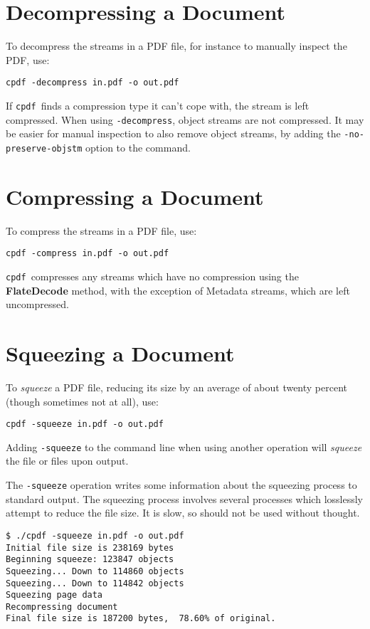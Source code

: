 \documentclass{book}
\newcommand{\cpdf}{\texttt{cpdf}}
\begin{document}
  \section{Decompressing a Document}
  To decompress the streams in a PDF file, for instance to manually inspect the
PDF, use:
  \begin{framed}
   \small\verb!cpdf -decompress in.pdf -o out.pdf!
  \end{framed}
  \noindent If \cpdf\ finds a compression type it can't cope with, the stream is left compressed. When using \texttt{-decompress}, object streams are not compressed. It may be easier for manual inspection to also remove object streams, by adding the \texttt{-no-preserve-objstm} option to the command.
  \section{Compressing a Document}
  To compress the streams in a PDF file, use:
  \begin{framed}
    \small\verb!cpdf -compress in.pdf -o out.pdf!
  \end{framed}
  \noindent\cpdf\ compresses any streams which have no compression using the
  \textbf{Flate\-Decode} method, with the exception of Metadata streams, which
  are left uncompressed.
  
  \section{Squeezing a Document}
  To \textit{squeeze} a PDF file, reducing its size by an average of about twenty percent (though sometimes not at all), use:
  \begin{framed}
    \small\verb!cpdf -squeeze in.pdf -o out.pdf!
  \end{framed}
  \noindent Adding \texttt{-squeeze} to the command line when using another operation will \textit{squeeze} the file or files upon output.
  
  The \texttt{-squeeze} operation writes some information about the squeezing process to standard output. The squeezing process involves several processes which losslessly attempt to reduce the file size. It is slow, so should not be used without thought.

\begin{verbatim}
$ ./cpdf -squeeze in.pdf -o out.pdf
Initial file size is 238169 bytes
Beginning squeeze: 123847 objects
Squeezing... Down to 114860 objects
Squeezing... Down to 114842 objects
Squeezing page data
Recompressing document
Final file size is 187200 bytes,  78.60% of original.
\end{verbatim}
\end{document}
